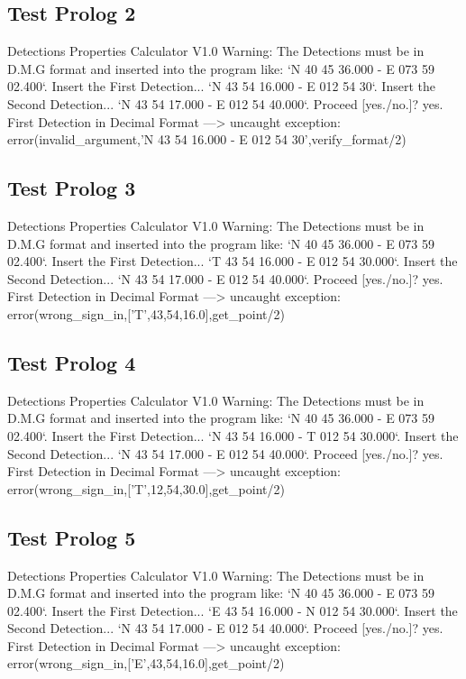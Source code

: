 \documentclass{article}
\begin{document}
\subsection*{Test Prolog 2}
	\begin{spverbatim}
		Detections Properties Calculator V1.0
		Warning: The Detections must be in D.M.G format and inserted into the program like: `N 40 45 36.000 - E 073 59 02.400`.
		Insert the First Detection...
		`N 43 54 16.000 - E 012 54 30`.
		Insert the Second Detection...
		`N 43 54 17.000 - E 012 54 40.000`.
		Proceed [yes./no.]?
		yes.
		First Detection in Decimal Format ---> 
		uncaught exception: error(invalid_argument,'N 43 54 16.000 - E 012 54 30',verify_format/2)
	\end{spverbatim}

\subsection*{Test Prolog 3}
	\begin{spverbatim}
		Detections Properties Calculator V1.0
		Warning: The Detections must be in D.M.G format and inserted into the program like: `N 40 45 36.000 - E 073 59 02.400`.
		Insert the First Detection...
		`T 43 54 16.000 - E 012 54 30.000`.
		Insert the Second Detection...
		`N 43 54 17.000 - E 012 54 40.000`.
		Proceed [yes./no.]?
		yes.
		First Detection in Decimal Format ---> 
		uncaught exception: error(wrong_sign_in,['T',43,54,16.0],get_point/2)
	\end{spverbatim}

\subsection*{Test Prolog 4}
	\begin{spverbatim}
		Detections Properties Calculator V1.0
		Warning: The Detections must be in D.M.G format and inserted into the program like: `N 40 45 36.000 - E 073 59 02.400`.
		Insert the First Detection...
		`N 43 54 16.000 - T 012 54 30.000`.
		Insert the Second Detection...
		`N 43 54 17.000 - E 012 54 40.000`.
		Proceed [yes./no.]?
		yes.
		First Detection in Decimal Format ---> 
		uncaught exception: error(wrong_sign_in,['T',12,54,30.0],get_point/2)
	\end{spverbatim}

\subsection*{Test Prolog 5}
	\begin{spverbatim}
		Detections Properties Calculator V1.0
		Warning: The Detections must be in D.M.G format and inserted into the program like: `N 40 45 36.000 - E 073 59 02.400`.
		Insert the First Detection...
		`E 43 54 16.000 - N 012 54 30.000`.
		Insert the Second Detection...
		`N 43 54 17.000 - E 012 54 40.000`.
		Proceed [yes./no.]?
		yes.
		First Detection in Decimal Format ---> 
		uncaught exception: error(wrong_sign_in,['E',43,54,16.0],get_point/2)
	\end{spverbatim}
\end{document}
